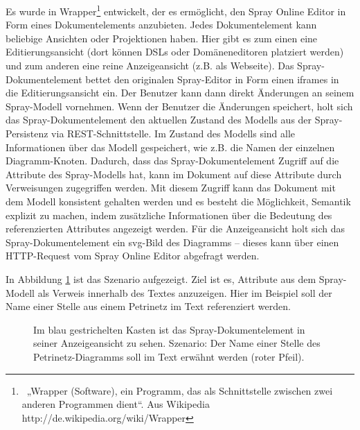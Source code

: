  
Es wurde in Wrapper\footnote{~„Wrapper (Software), ein Programm, das als Schnittstelle zwischen zwei anderen Programmen dient“. Aus Wikipedia http://de.wikipedia.org/wiki/Wrapper} entwickelt, der es ermöglicht, den Spray Online Editor in Form eines Dokumentelements anzubieten. Jedes Dokumentelement kann beliebige Ansichten oder Projektionen haben. Hier gibt es zum einen eine Editierungsansicht (dort können DSLs oder Domäneneditoren platziert werden) und zum anderen eine reine Anzeigeansicht (z.B. als Webseite). Das Spray-Dokumentelement bettet den originalen Spray-Editor in Form einen iframes in die Editierungsansicht ein. Der Benutzer kann dann direkt Änderungen an seinem Spray-Modell vornehmen. Wenn der Benutzer die Änderungen speichert, holt sich das Spray-Dokumentelement den aktuellen Zustand des Modells aus der Spray-Persistenz via REST-Schnittstelle. Im Zustand des Modells sind alle Informationen über das Modell gespeichert, wie z.B. die Namen der einzelnen Diagramm-Knoten. Dadurch, dass das Spray-Dokumentelement Zugriff auf die Attribute des Spray-Modells hat, kann im Dokument auf diese Attribute durch Verweisungen zugegriffen werden. Mit diesem Zugriff kann das Dokument mit dem Modell konsistent gehalten werden und es besteht die Möglichkeit, Semantik explizit zu machen, indem zusätzliche Informationen über die Bedeutung des referenzierten Attributes angezeigt werden. Für die Anzeigeansicht holt sich das Spray-Dokumentelement ein svg-Bild des Diagramms -- dieses kann über einen HTTP-Request vom Spray Online Editor abgefragt werden.

 
In Abbildung \ref{sprayanzeigen} ist das Szenario aufgezeigt. Ziel ist es, Attribute aus dem Spray-Modell als Verweis innerhalb des Textes anzuzeigen. Hier im Beispiel soll der Name einer Stelle aus einem Petrinetz im Text referenziert werden.

 
\begin{figure}[h!]
\centering
\advance\leftskip-2.5cm
\caption[Spray-Dokumentelement Repräsentation]{ Im blau gestrichelten Kasten ist das Spray-Dokumentelement in seiner Anzeigeansicht zu sehen. Szenario: Der Name einer Stelle des Petrinetz-Diagramms soll im Text erwähnt werden (roter Pfeil). }\label{sprayanzeigen}
\end{figure}
 
